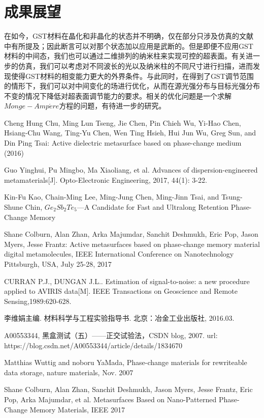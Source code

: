 \section{成果展望}
\label{sec:forecast}
在如今，GST材料在晶化和非晶化的状态并不明确，仅在部分只涉及仿真的文献中有所提及；因此断言可以对那个状态加以应用是武断的。但是即便不应用GST材料的中间态，我们也可以通过二维排列的纳米柱来实现可控的超表面。有关进一步的仿真，我们可以考虑对不同波长的光以及纳米柱的不同尺寸进行扫描，进而发现使得GST材料的相变能力更大的外界条件。与此同时，在得到了GST调节范围的情形下，我们可以对中间变化的场进行优化，从而在源光强分布与目标光强分布不变的情况下降低对超表面调节能力的要求。相关的优化问题是一个求解$Monge-Amp\acute{e}re$方程的问题，有待进一步的研究。

\begin{thebibliography}{99}
 Cheng Hung Chu, Ming Lun Tseng, Jie Chen, Pin Chieh Wu, Yi-Hao Chen, Hsiang-Chu Wang, Ting-Yu Chen, Wen Ting Hsieh, Hui Jun Wu, Greg Sun, and Din Ping Tsai: Active dielectric metasurface based on phase-change
medium (2016)

 Guo Yinghui, Pu Mingbo, Ma Xiaoliang, et al. Advances of dispersion-engineered metamaterials[J]. Opto-Electronic Engineering, 2017, 44(1): 3-22. 

 Kin-Fu Kao, Chain-Ming Lee, Ming-Jung Chen, Ming-Jinn Tsai, and Tsung-Shune Chin, $Ge_{2}Sb_{2}Te_{5}$---A Candidate for Fast and Ultralong Retention Phase-Change Memory

 Shane Colburn, Alan Zhan, Arka Majumdar, Sanchit Deshmukh, Eric Pop, Jason Myers, Jesse Frantz: Active metasurfaces based on phase-change memory material digital metamolecules, IEEE International Conference on Nanotechnology
Pittsburgh, USA, July 25-28, 2017

 CURRAN P.J., DUNGAN J.L.. Estimation of signal-to-noise: a new procedure applied to AVIRIS data[M]. IEEE Transactions on Geoscience and Remote Sensing,1989:620-628.

 李维娟主编. 材料科学与工程实验指导书. 北京：冶金工业出版社, 2016.03.

 A00553344, 黑盒测试（五）——正交试验法，CSDN blog, 2007. url: https://blog.csdn.net/A00553344/article/details/1834670

 Matthias Wuttig and noboru YaMada, Phase-change materials for rewriteable
data storage, nature materials, Nov. 2007

 Shane Colburn, Alan Zhan, Sanchit Deshmukh, Jason Myers, Jesse Frantz, Eric Pop, Arka Majumdar, et al. Metasurfaces Based on Nano-Patterned Phase-Change Memory Materials, IEEE 2017


\end{thebibliography}
